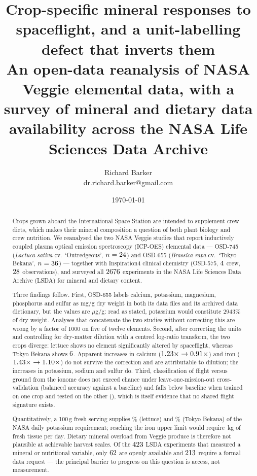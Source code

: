 \documentclass[11pt,a4paper]{article}
\title{\vspace{-1.5em}\sffamily\color{smanavy}\bfseries
Crop-specific mineral responses to spaceflight, and a unit-labelling
defect that inverts them\\[0.35em]
\large\mdseries\color{smatext}
An open-data reanalysis of NASA Veggie elemental data, with a survey of
mineral and dietary data availability across the NASA Life Sciences Data Archive}
\author{\sffamily Richard Barker\\
  \small\ttfamily dr.richard.barker@gmail.com}
\date{\small\today}
\begin{document}
\maketitle
\thispagestyle{fancy}

\begin{abstract}
\noindent
Crops grown aboard the International Space Station are intended to supplement
crew diets, which makes their mineral composition a question of both plant
biology and crew nutrition. We reanalysed the two NASA Veggie studies that
report inductively coupled plasma optical emission spectroscopy (ICP-OES)
elemental data --- OSD-745 (\emph{Lactuca sativa} cv.\ `Outredgeous',
$n=24$) and OSD-655 (\emph{Brassica rapa} cv.\ `Tokyo Bekana',
$n=36$) --- together with Inspiration4 clinical chemistry (OSD-575,
$4$ crew, $28$ observations), and surveyed all $2676$
experiments in the NASA Life Sciences Data Archive (LSDA) for mineral and
dietary content.

Three findings follow. First, OSD-655 labels calcium, potassium, magnesium,
phosphorus and sulfur as mg/g dry weight in both its data files and its
archived data dictionary, but the values are $\mu$g/g: read as stated,
potassium would constitute \(2943\%\) of dry weight. Analyses that concatenate
the two studies without correcting this are wrong by a factor of 1000 on five
of twelve elements. Second, after correcting the units and controlling for
dry-matter dilution with a centred log-ratio transform, the two crops diverge:
lettuce shows no element significantly altered by spaceflight, whereas Tokyo
Bekana shows $6$. Apparent increases in calcium
(\(1.23\times\rightarrow0.91\times\)) and iron
(\(1.43\times\rightarrow1.10\times\)) do not survive the correction and
are attributable to dilution; the increases in potassium, sodium and sulfur do.
Third, classification of flight versus ground from the ionome does not exceed
chance under leave-one-mission-out cross-validation
(balanced accuracy \MlMissionRf{} against a \MlbaselineMission{} baseline) and
falls below baseline when trained on one crop and tested on the other
(\MlCropRfMargin), which is itself evidence that no shared flight signature
exists.

Quantitatively, a 100\,g fresh serving supplies \ServeLetK\%
(lettuce) and \ServeTbK\% (Tokyo Bekana) of the NASA daily
potassium requirement; reaching the iron upper limit would require
\OverloadFeLet\,kg of fresh tissue per day. Dietary mineral overload from
Veggie produce is therefore not plausible at achievable harvest scales. Of the
$423$ LSDA experiments that measured a mineral or nutritional
variable, only $62$ are openly available and $213$
require a formal data request --- the principal barrier to progress on this
question is access, not measurement.
\end{abstract}
\end{document}
